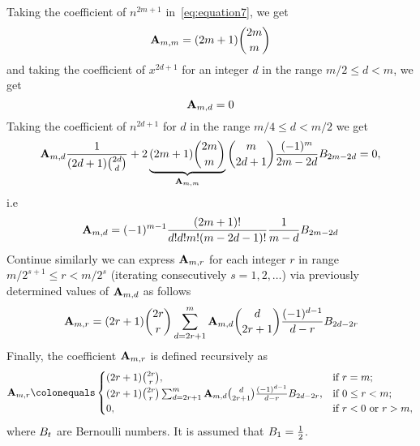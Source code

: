 Taking the coefficient of $n^{2m+1}$ in~\eqref{eq:equation7}, we get
\begin{equation}
    {\mathbf{A}} \sb{m,m} = (2m+1)\binom{2m}{m}\label{eq:equation8}
\end{equation}
and taking the coefficient of $x^{2d+1}$ for an integer $d$ in the range $m/2 \leq d < m$, we get
\begin{equation}
    {\mathbf{A}} \sb{m,d} = 0\label{eq:equation9}
\end{equation}
Taking the coefficient of $n^{2d+1}$ for $d$ in the range $m/4 \leq d < m/2$ we get
\begin{equation}
    {\mathbf{A}} \sb{m,d} \frac{1}{(2d+1) \binom{2d}{d}}
    +2 \underbrace{(2m+1) \binom{2m}{m}}_{{\mathbf{A}} \sb{m,m}} \binom{m}{2d+1} \frac{(-1)^m}{2m-2d} {B}\sb{2m-2d} = 0,\label{eq:equation10}
\end{equation}
i.e
\begin{equation}
    {\mathbf{A}} \sb{m,d} = (-1)^{m-1} \frac{(2m+1)!}{d!d!m!(m-2d-1)!} \frac{1}{m-d} {B}\sb{2m-2d}\label{eq:equation11}
\end{equation}
Continue similarly we can express ${\mathbf{A}} \sb{m,r}$ for each integer $r$ in range $m/2^{s+1}\leq r < m/2^s$
(iterating consecutively $s=1,2,\ldots$) via previously determined values of ${\mathbf{A}} \sb{m,d}$ as follows
\begin{equation}
    {\mathbf{A}} \sb{m,r} =
    (2r+1) \binom{2r}{r} \sum_{d=2r+1}^{m} {\mathbf{A}} \sb{m,d} \binom{d}{2r+1} \frac{(-1)^{d-1}}{d-r}
    {B}\sb{2d-2r}\label{eq:equation12}
\end{equation}
Finally, the coefficient ${\mathbf{A}} \sb{m,r}$ is defined recursively as
\begin{equation}
    \label{eq:def_coeff_a}
    \coeffA{m}{r} \colonequals
    \begin{cases}
    (2r+1)
        \binom{2r}{r}, & \text{if } r=m; \\
        (2r+1) \binom{2r}{r} \sum_{d=2r+1}^{m} \coeffA{m}{d} \binom{d}{2r+1} \frac{(-1)^{d-1}}{d-r}
        \bernoulli{2d-2r}, & \text{if } 0 \leq r<m; \\
        0, & \text{if } r<0 \text{ or } r>m,
    \end{cases}
\end{equation}
where ${B}\sb{t}$ are Bernoulli numbers.
It is assumed that ${B}\sb{1}=\frac{1}{2}$.
